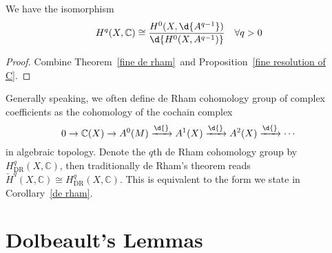 \begin{cor}\label{de rham}
    We have the isomorphism
    \[H^q(X,\mathbb{C})\cong\frac{H^0(X,\d{A^{q-1}})}{\d{H^0(X,A^{q-1})}}\quad\forall q>0\]
\end{cor}
\begin{proof}
    Combine Theorem~\ref{fine de rham}~and Proposition~\ref{fine resolution of C}.
\end{proof}

\begin{rem}
    Generally speaking, we often define de Rham cohomology group of complex coefficients as the cohomology of the cochain complex
    \[0\to\mathbb{C}(X)\to A^0(M)\xrightarrow{\d{}}A^1(X)\xrightarrow{\d{}}A^2(X)\xrightarrow{\d{}}\cdots\]
    in algebraic topology.
    Denote the $q$th de Rham cohomology group by $H^q_{\mathrm{DR}}(X,\mathbb{C})$, then traditionally de Rham's theorem reads $\check{H}^q(X,\mathbb{C})\cong H^q_{\mathrm{DR}}(X,\mathbb{C})$.
    This is equivalent to the form we state in Corollary~\ref{de rham}.
\end{rem}

\section{Dolbeault's Lemmas}